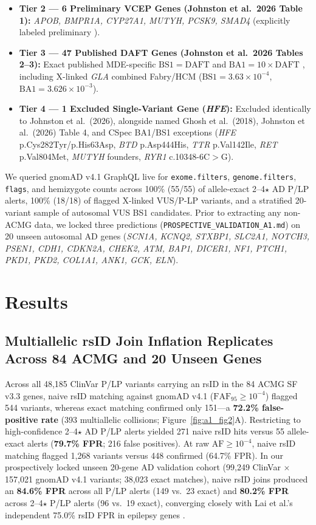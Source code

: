 \documentclass[11pt,letterpaper]{article}
\begin{document}
\begin{itemize}
  \item \textbf{Tier 2 --- 6 Preliminary VCEP Genes (Johnston et al.\ 2026 Table 1):} \textit{APOB, BMPR1A, CYP27A1, MUTYH, PCSK9, SMAD4} (explicitly labeled preliminary \citep{johnston2026daft}).
  \item \textbf{Tier 3 --- 47 Published DAFT Genes (Johnston et al.\ 2026 Tables 2--3):} Exact published MDE-specific $\mathrm{BS1}=\mathrm{DAFT}$ and $\mathrm{BA1}=10\times\mathrm{DAFT}$ \citep{johnston2026daft}, including X-linked \textit{GLA} combined Fabry/HCM ($\mathrm{BS1}=3.63\times 10^{-4}$, $\mathrm{BA1}=3.626\times 10^{-3}$).
  \item \textbf{Tier 4 --- 1 Excluded Single-Variant Gene (\textit{HFE}):} Excluded identically to Johnston et al.\ (2026), alongside named Ghosh et al.\ (2018), Johnston et al.\ (2026) Table 4, and CSpec BA1/BS1 exceptions (\textit{HFE} p.Cys282Tyr/p.His63Asp, \textit{BTD} p.Asp444His, \textit{TTR} p.Val142Ile, \textit{RET} p.Val804Met, \textit{MUTYH} founders, \textit{RYR1} c.10348-6C$>$G).
\end{itemize}

We queried gnomAD v4.1 GraphQL live for \texttt{exome.filters}, \texttt{genome.filters}, \texttt{flags}, and hemizygote counts across 100\% (55/55) of allele-exact 2--4$\star$ AD P/LP alerts, 100\% (18/18) of flagged X-linked VUS/P-LP variants, and a stratified 20-variant sample of autosomal VUS BS1 candidates. Prior to extracting any non-ACMG data, we locked three predictions (\texttt{PROSPECTIVE\_VALIDATION\_A1.md}) on 20 unseen autosomal AD genes (\textit{SCN1A, KCNQ2, STXBP1, SLC2A1, NOTCH3, PSEN1, CDH1, CDKN2A, CHEK2, ATM, BAP1, DICER1, NF1, PTCH1, PKD1, PKD2, COL1A1, ANK1, GCK, ELN}).

\section{Results}
\subsection{Multiallelic rsID Join Inflation Replicates Across 84 ACMG and 20 Unseen Genes}
Across all 48,185 ClinVar P/LP variants carrying an rsID in the 84 ACMG SF v3.3 genes, naive rsID matching against gnomAD v4.1 ($\mathrm{FAF}_{95}\ge 10^{-4}$) flagged 544 variants, whereas exact  matching confirmed only 151---a \textbf{72.2\% false-positive rate} (393 multiallelic collisions; Figure~\ref{fig:a1_fig2}A). Restricting to high-confidence 2--4$\star$ AD P/LP alerts yielded 271 naive rsID hits versus 55 allele-exact alerts (\textbf{79.7\% FPR}; 216 false positives). At raw $\mathrm{AF}\ge 10^{-4}$, naive rsID matching flagged 1,268 variants versus 448 confirmed (64.7\% FPR). In our prospectively locked unseen 20-gene AD validation cohort (99,249 ClinVar $\times$ 157,021 gnomAD v4.1 variants; 38,023 exact matches), naive rsID joins produced an \textbf{84.6\% FPR} across all P/LP alerts (149 vs.\ 23 exact) and \textbf{80.2\% FPR} across 2--4$\star$ P/LP alerts (96 vs.\ 19 exact), converging closely with Lai et al.'s independent 75.0\% rsID FPR in epilepsy genes \citep{lai2026epilepsy}.
\end{document}
